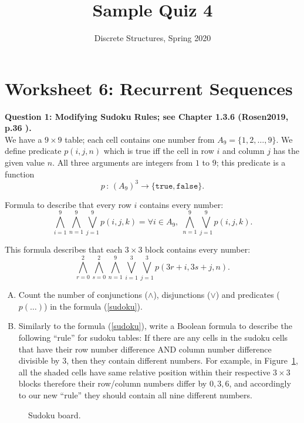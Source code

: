 \documentclass[jou]{apa6}
\title{Sample Quiz 4}
\author{Discrete Structures, Spring 2020}
\affiliation{RBS}
\begin{document}

\twocolumn
\section{Worksheet 6: Recurrent Sequences}

\vspace{10pt}
{\bf Question 1: Modifying Sudoku Rules; see Chapter 1.3.6 
(Rosen2019, p.36 ).}\\ 
We have a $9 \times 9$ table; each cell contains one number from 
$A_9 = \{ 1, 2,\ldots, 9 \}$. We define predicate $p(i,j,n)$ which 
is true iff the cell in row $i$ and column $j$ has the given value $n$.
All three arguments are integers from $1$ to $9$; this predicate is a function 
$$p \,:\, \left( A_9 \right) ^3 \rightarrow \{ \mathtt{true}, \mathtt{false} \}.$$

Formula to describe that every row $i$ contains every number: 
$$\bigwedge\limits_{i=1}^{9} \bigwedge\limits_{n=1}^{9} \bigvee_{j=1}^{9} p(i,j,k) = 
\forall i \in A_9,\;\bigwedge\limits_{n=1}^{9} \bigvee_{j=1}^{9} p(i,j,k).$$

This formula describes that each $3 \times 3$ block contains every number:
\begin{equation} 
\label{sudoku}
\bigwedge\limits_{r = 0}^{2} \bigwedge\limits_{s = 0}^{2} \bigwedge\limits_{n = 1}^{9}
\bigvee\limits_{i = 1}^{3} \bigvee\limits_{j = 1}^{3} p(3r+i, 3s+j, n).
\end{equation}

\begin{enumerate}[(A)]
\item Count the number of conjunctions ($\wedge$), disjunctions ($\vee$) and 
predicates ($p(\ldots)$) in the formula (\ref{sudoku}).
\item Similarly to the formula (\ref{sudoku}), write a Boolean formula 
to describe the following ``rule'' for sudoku tables: 
If there are any cells in the sudoku cells that have their row number difference AND column 
number difference divisible by $3$, then they contain different numbers.
For example, in Figure~\ref{fig:sudoku}, all the shaded cells have same relative position within their
respective $3 \times 3$ blocks \textendash{} therefore their row/column numbers differ by 
$0,3,6$, and accordingly to our new ``rule'' they should contain all nine different numbers. 
\end{enumerate}


\begin{figure}[!htb]
\caption{\label{fig:sudoku} Sudoku board.}
\end{figure}
\end{document}
